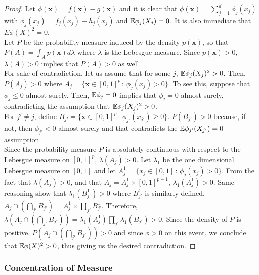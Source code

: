 \begin{proof}

Let $\phi(\mathbf{x}) = f(\mathbf{x}) - g(\mathbf{x})$ and it is clear that $\phi(\mathbf{x}) = \sum_{j=1}^d \phi_j(x_j)$ with $\phi_j(x_j) = f_j(x_j) - h_j(x_j)$ and ${\mathbb E} \phi_j(X_j) = 0$. It is also immediate that $E \phi(X)^2 = 0$. \\

Let $P$ be the probability measure induced by the density $p(\mathbf{x})$, so that $P(A) = \int_A p(\mathbf{x}) d\lambda$ where $\lambda$ is the Lebesgue measure. Since $p(\mathbf{x}) > 0$, $\lambda(A) > 0$ implies that $P(A) > 0$ as well. \\

For sake of contradiction, let us assume that for some $j$, ${\mathbb E} \phi_j(X_j)^2 > 0$. Then, $P(A_j ) > 0$ where $A_j = \{ \mathbf{x} \in [0,1]^p \,:\, \phi_j(x_j) > 0 \}$. To see this, suppose that $\phi_j \leq 0$ almost surely. Then, ${\mathbb E} \phi_j = 0$ implies that $\phi_j = 0$ almost surely, contradicting the assumption that ${\mathbb E} \phi_j(X_j)^2 > 0$.\\

For $j' \neq j$, define $B_{j'} = \{ \mathbf{x} \in [0,1]^p \,:\, \phi_{j'}(x_{j'}) \geq 0 \}$. $P( B_{j'} ) > 0$ because, if not, then $\phi_{j'} < 0$ almost surely and that contradicts the ${\mathbb E} \phi_{j'}(X_{j'}) = 0$ assumption. \\

Since the probability measure $P$ is absolutely continuous with respect to the Lebesgue measure on $[0, 1]^p$, $\lambda (A_j) > 0$. Let $\lambda_1$ be the one dimensional Lebesgue measure on $[0,1]$ and let $A^1_j = \{ x_j \in [0,1] \,:\, \phi_j(x_j) > 0\}$. From the fact that $\lambda(A_j) > 0$, and that $A_j = A^1_j \times [0,1]^{p-1}$, $\lambda_1(A^1_j) > 0$. Same reasoning show that $\lambda_1(B^1_{j'}) > 0$ where $B^1_{j'}$ is similarly defined.\\

$A_j \cap \left( \bigcap_{j'} B_{j'} \right) = A^1_j \times \prod_{j'} B^1_{j'}$. Therefore, $\lambda ( A_j \cap \left( \bigcap_{j'} B_{j'} \right) ) = \lambda_1(A^1_j)  \prod_{j'} \lambda_1 (B_{j'}) > 0$. Since the density of $P$ is positive, $P( A_j \cap \left( \bigcap_{j'} B_{j'} \right) ) > 0$ and since $\phi > 0$ on this event, we conclude that ${\mathbb E} \phi(X)^2 > 0$, thus giving us the desired contradiction.

\end{proof}

\subsubsection{Concentration of Measure}

